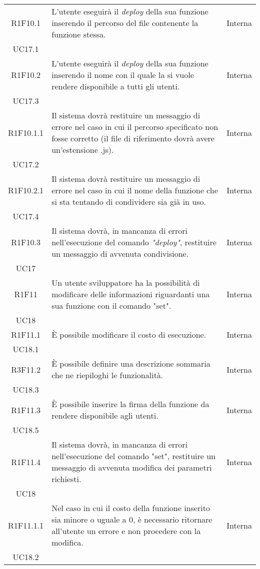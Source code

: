 \begin{longtable}{|c|p{8cm}|C{2cm}|}
	R1F10.1 &  L'utente eseguirà il \textit{deploy\glo} della sua funzione inserendo il percorso del file contenente la funzione stessa. & \centering Interna \\ UC17.1 \tabularnewline

	R1F10.2 &  L'utente eseguirà il \textit{deploy\glo} della sua funzione inserendo il nome con il quale la si vuole rendere disponibile a tutti gli utenti. & \centering Interna \\ UC17.3 \tabularnewline


	R1F10.1.1 &  Il sistema dovrà restituire un messaggio di errore nel caso in cui il percorso specificato non fosse corretto (il file di riferimento dovrà avere un'estensione .js). & \centering Interna \\ UC17.2 \tabularnewline
	
	R1F10.2.1 &  Il sistema dovrà restituire un messaggio di errore nel caso in cui il nome della funzione che si sta tentando di condividere sia già in uso. & \centering Interna \\ UC17.4 \tabularnewline

	R1F10.3 &  Il sistema dovrà, in mancanza di errori nell'esecuzione del comando \textit{"deploy\glos"}, restituire un messaggio di avvenuta condivisione. & \centering Interna \\ UC17 \tabularnewline

	R1F11 &  Un utente sviluppatore ha la possibilità di modificare delle informazioni riguardanti una sua funzione con il comando "set". & \centering Interna \\ UC18 \tabularnewline

	R1F11.1 &  È possibile modificare il costo di esecuzione. & \centering Interna \\ UC18.1 \tabularnewline

	R3F11.2 &  È possibile definire una descrizione sommaria che ne riepiloghi le funzionalità. & \centering Interna \\ UC18.3 \tabularnewline

	R1F11.3 &  È possibile inserire la firma della funzione da rendere disponibile agli utenti. & \centering Interna \\ UC18.5 \tabularnewline

	R1F11.4 &  Il sistema dovrà, in mancanza di errori nell'esecuzione del comando "set", restituire un messaggio di avvenuta modifica dei parametri richiesti. & \centering Interna \\ UC18 \tabularnewline

	R1F11.1.1 &  Nel caso in cui il costo della funzione inserito sia minore o uguale a 0, è necessario ritornare all'utente un errore e non procedere con la modifica. & \centering Interna \\ UC18.2 \tabularnewline


\end{longtable}
